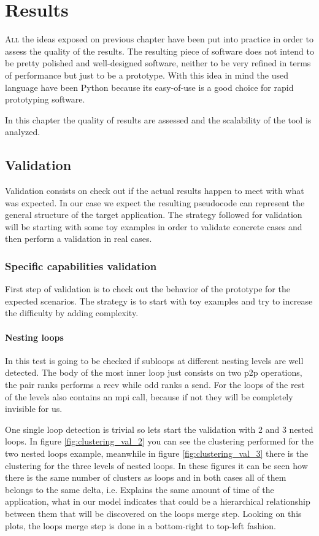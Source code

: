 \chapter{Results}

\lettrine{A}{ll} the ideas exposed on previous chapter have been put into practice in order
to assess the quality of the results. The resulting piece of
software does not intend to be pretty polished and well-designed software,
neither to be very refined in terms of performance but just to be a prototype.
With this idea in mind the used language have been Python because its
easy-of-use is a good choice for rapid prototyping software.

In this chapter the quality of results are assessed and the scalability
of the tool is analyzed.

\section{Validation}\label{s:validation}

Validation consists on check out if the actual results happen to meet with what
was expected. In our case we expect the resulting pseudocode can represent the
general structure of the target application. The strategy followed for
validation will be starting with some toy examples in order to validate concrete
cases and then perform a validation in real cases.

\subsection{Specific capabilities validation}

First step of validation is to check out the behavior of the prototype for 
the expected scenarios. The strategy is to start with toy examples and try to
increase the difficulty by adding complexity.

\subsubsection{Nesting loops}

In this test is going to be checked if subloops at different nesting levels are
well detected. The body of the most inner loop just consists on two p2p operations, the
pair ranks performs a recv while odd ranks a send. For the loops of the rest of
the levels also contains an mpi call, because if not they will be completely
invisible for us. 

One single loop detection is trivial so lets start the validation with 2 and 3 nested
loops. In figure \ref{fig:clustering_val_2} you can see the clustering performed
for the two nested loops example, meanwhile in figure
\ref{fig:clustering_val_3} there is the clustering for the three levels of
nested loops. In these figures it can be seen how there is the
same number of clusters as loops and in both cases all of them belongs to the
same delta, i.e. Explains the same amount of time of the application, what in our
model indicates that could be a hierarchical relationship between them that will
be discovered on the loops merge step. Looking on this plots, the loops merge
step is done in a bottom-right to top-left fashion.


